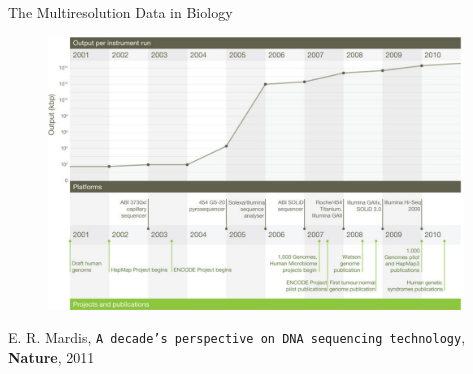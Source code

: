 \documentclass[first=dgreen,second=purple,logo=redexc]{aaltoslides}
\begin{document}
\begin{frame} {The Multiresolution Data in Biology} 

\vspace{1mm}

\begin{figure}
\centering
  \includegraphics[trim=0cm 1cm 0.5cm 0.5cm, clip=true, width=0.98\textwidth]{figures/sequencing}
\end{figure}

\vspace{-3mm}

\footnotesize E. R. Mardis, \texttt{A decade's perspective on DNA sequencing technology}, \textbf{Nature}, 2011

\end{frame}

\end{document}
